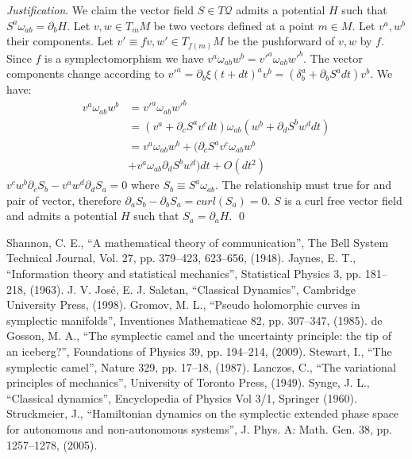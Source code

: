 \documentclass[aps,pra,10pt,twocolumn,floatfix,nofootinbib]{revtex4-1}
\numberwithin{equation}{section}
\theoremstyle{definition}
\newenvironment{justification}{\emph{Justification}.}{\qed}
\begin{document}
\begin{justification}
	We claim the vector field $S \in T\mathcal{Q}$ admits a potential $H$ such that $S^{a} \omega_{ab} = \partial_{b}H$. Let $v, w \in T_m M$ be two vectors defined at a point $m \in M$. Let $v^a, w^b$ their components. Let $v'\equiv f v, w' \in T_{f(m)}M$ be the pushforward of $v, w$ by $f$. Since $f$ is a symplectomorphism we have $v^{a} \omega_{ab} w^{b} = v'^{a} \omega_{ab} w'^{b}$. The vector components change according to $v'^a = \partial_b \xi(t+dt)^a v^b = (\delta^a_b + \partial_b S^a dt) v^b$. We have:
	\begin{align*}
	v^{a} \omega_{ab} w^{b} &= v'^{a} \omega_{ab} w'^{b}  \\
	&= (v^{a} + \partial_{c} S^{a} v^{c} dt) \omega_{ab} ( w^{b} + \partial_{d} S^{b} w^{d} dt) \\
	&= v^{a} \omega_{ab} w^{b} + (\partial_{c} S^{a} v^{c} \omega_{ab} w^{b} \\
	&+ v^{a} \omega_{ab} \partial_{d} S^{b} w^{d}) dt + O(dt^2)
	\end{align*}
	$v^{c} w^{b} \partial_{c} S_{b} - v^{a} w^{d} \partial_{d} S_{a} = 0$ where $S_{b} \equiv S^{a} \omega_{ab}$. The relationship must true for and pair of vector, therefore $\partial_{a} S_{b} - \partial_{b} S_{a} = curl(S_{a}) = 0$. $S$ is a curl free vector field and admits a potential $H$ such that $S_{a} = \partial_{a}H$.
\end{justification}


\begin{thebibliography}{0}

 Shannon, C. E., ``A mathematical theory of communication'', The Bell System Technical Journal, Vol. 27, pp. 379--423, 623--656, (1948).
 Jaynes, E. T., ``Information theory and statistical mechanics'', Statistical Physics 3, pp. 181--218, (1963).
 J. V. Jos\'{e}, E. J. Saletan, ``Classical Dynamics'', Cambridge University Press, (1998).
 Gromov, M. L., ``Pseudo holomorphic curves in symplectic manifolds'', Inventiones Mathematicae 82, pp. 307--347, (1985).
 de Gosson, M. A., ``The symplectic camel and the uncertainty principle: the tip of an iceberg?'', Foundations of Physics 39, pp. 194--214, (2009).
 Stewart, I., ``The symplectic camel'', Nature 329, pp. 17--18, (1987).
 Lanczos, C., ``The variational principles of mechanics'', University of Toronto Press, (1949).
 Synge, J. L., ``Classical dynamics'', Encyclopedia of Physics Vol 3/1, Springer (1960).
 Struckmeier, J., ``Hamiltonian dynamics on the symplectic extended phase space for autonomous and non-autonomous systems'', J. Phys. A: Math. Gen. 38, pp. 1257--1278, (2005).

\end{thebibliography}
\end{document}
